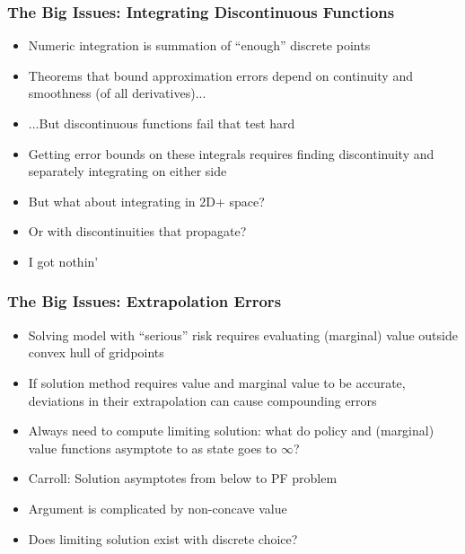 \documentclass[11pt]{beamer}
\newcommand{\bi}{\begin{itemize}}
\newcommand{\ei}{\end{itemize}}
\begin{document}
\begin{frame}
\frametitle{The Big Issues: Integrating Discontinuous Functions}

\bi
\item <1->Numeric integration is summation of ``enough'' discrete points

\item <2->Theorems that bound approximation errors depend on continuity and smoothness (of all derivatives)...

\item <2->...But discontinuous functions fail that test hard

\item <3->Getting error bounds on these integrals requires finding discontinuity and separately integrating on either side

\item <4->But what about integrating in 2D+ space?

\item <4->Or with discontinuities that propagate?

\item <5->I got nothin'

\ei
\end{frame}


\begin{frame}
\frametitle{The Big Issues: Extrapolation Errors}

\bi
\item <1->Solving model with ``serious'' risk requires evaluating (marginal) value outside convex hull of gridpoints

\item <2->If solution method requires value and marginal value to be accurate, deviations in their extrapolation can cause compounding errors

\item <3->Always need to compute limiting solution: what do policy and (marginal) value functions asymptote to as state goes to $\infty$?

\item <3->Carroll: Solution asymptotes from below to PF problem

\item <4->Argument is complicated by non-concave value

\item <4->Does limiting solution exist with discrete choice?

\ei
\end{frame}
\end{document}
